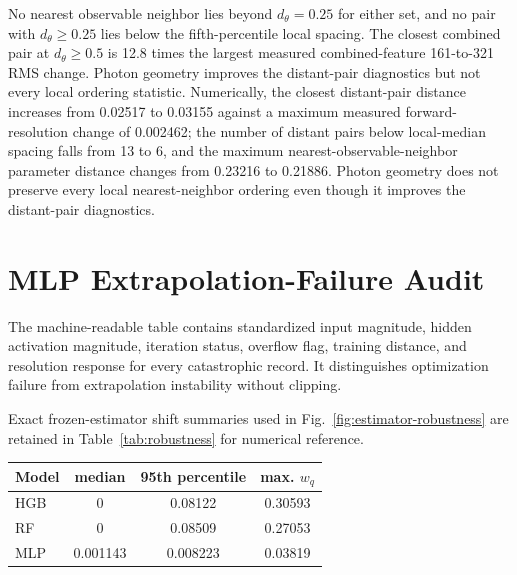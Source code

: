 \documentclass[11pt]{article}
\newcommand{\wq}{w_q}
\begin{document}
No nearest observable neighbor lies beyond $d_\theta=0.25$ for either set,
and no pair with $d_\theta\geq0.25$ lies below the fifth-percentile local
spacing. The closest combined pair at $d_\theta\geq0.5$ is 12.8 times the
largest measured combined-feature 161-to-321 RMS change. Photon geometry
improves the distant-pair diagnostics but not every local ordering statistic.
Numerically, the closest distant-pair distance increases from 0.02517 to
0.03155 against a maximum measured forward-resolution change of 0.002462;
the number of distant pairs below local-median spacing falls from 13 to 6, and
the maximum nearest-observable-neighbor parameter distance changes from
0.23216 to 0.21886. Photon geometry does not preserve every local
nearest-neighbor ordering even though it improves the distant-pair diagnostics.

\section{MLP Extrapolation-Failure Audit}
The machine-readable table contains standardized input magnitude, hidden
activation magnitude, iteration status, overflow flag, training distance, and
resolution response for every catastrophic record. It distinguishes
optimization failure from extrapolation instability without clipping.

Exact frozen-estimator shift summaries used in
Fig.~\ref{fig:estimator-robustness} are retained in
Table~\ref{tab:robustness} for numerical reference.

\begin{center}
\begin{minipage}{.72\textwidth}
\label{tab:robustness}
\centering
\begin{tabular}{lccc}
Model & median & 95th percentile & max. $\wq$ \\
\hline
HGB & 0 & 0.08122 & 0.30593 \\
RF & 0 & 0.08509 & 0.27053 \\
MLP & 0.001143 & 0.008223 & 0.03819 \\
\end{tabular}
\end{minipage}
\end{center}

\FloatBarrier


\end{document}
